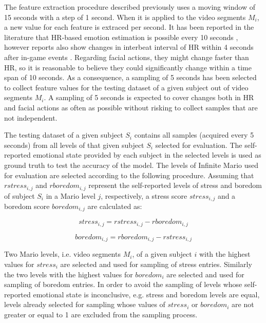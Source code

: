 The feature extraction procedure described previously uses a moving window of 15 seconds with a step of 1 second. When it is applied to the video segments $M_i$, a new value for each feature is extraced per second. It has been reported in the literature that HR-based emotion estimation is possible every 10 seconds \parencite{valenza2014revealing}, however reports also show changes in interbeat interval of HR within 4 seconds after in-game events \parencite{ravaja20051}. Regarding facial actions, they might change faster than HR, so it is reasonable to believe they could significantly change within a time span of 10 seconds. As a consequence, a sampling of 5 seconds has been selected to collect feature values for the testing dataset of a given subject out of video segments $M_i$. A sampling of 5 seconds is expected to cover changes both in HR and facial actions as often as possible without risking to collect samples that are not independent.

The testing dataset of a given subject $S_i$ contains all samples (acquired every 5 seconds) from all levels of that given subject $S_i$ selected for evaluation. The self-reported emotional state provided by each subject in the selected levels is used as ground truth to test the accuracy of the model. The levels of Infinite Mario used for evaluation are selected according to the following procedure. Assuming that $rstress_{i,j}$ and $rboredom_{i,j}$ represent the self-reported levels of stress and boredom of subject $S_i$ in a Mario level $j$, respectively, a stress score $stress_{i,j}$ and a boredom score $boredom_{i,j}$ are calculated as:

\begin{equation}
  stress_{i,j} = rstress_{i,j} - rboredom_{i,j}
  \label{eq:stress-score}
\end{equation}

\begin{equation}
  boredom_{i,j} = rboredom_{i,j} - rstress_{i,j}
  \label{eq:boredom-score}
\end{equation}

Two Mario levels, i.e. video segments $M_i$, of a given subject $i$ with the highest values for $stress_i$ are selected and used for sampling of stress entries. Similarly the two levels with the highest values for $boredom_i$ are selected and used for sampling of boredom entries. In order to avoid the sampling of levels whose self-reported emotional state is inconclusive, e.g. stress and boredom levels are equal, levels already selected for sampling whose values of $stress_i$ or $boredom_i$ are not greater or equal to 1 are excluded from the sampling process.

